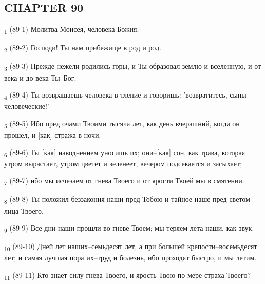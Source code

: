 \subsection{CHAPTER 90}
\begin{tcolorbox}
\textsubscript{1} (89-1) Молитва Моисея, человека Божия.
\end{tcolorbox}
\begin{tcolorbox}
\textsubscript{2} (89-2) Господи! Ты нам прибежище в род и род.
\end{tcolorbox}
\begin{tcolorbox}
\textsubscript{3} (89-3) Прежде нежели родились горы, и Ты образовал землю и вселенную, и от века и до века Ты--Бог.
\end{tcolorbox}
\begin{tcolorbox}
\textsubscript{4} (89-4) Ты возвращаешь человека в тление и говоришь: 'возвратитесь, сыны человеческие!'
\end{tcolorbox}
\begin{tcolorbox}
\textsubscript{5} (89-5) Ибо пред очами Твоими тысяча лет, как день вчерашний, когда он прошел, и [как] стража в ночи.
\end{tcolorbox}
\begin{tcolorbox}
\textsubscript{6} (89-6) Ты [как] наводнением уносишь их; они--[как] сон, как трава, которая утром вырастает, утром цветет и зеленеет, вечером подсекается и засыхает;
\end{tcolorbox}
\begin{tcolorbox}
\textsubscript{7} (89-7) ибо мы исчезаем от гнева Твоего и от ярости Твоей мы в смятении.
\end{tcolorbox}
\begin{tcolorbox}
\textsubscript{8} (89-8) Ты положил беззакония наши пред Тобою и тайное наше пред светом лица Твоего.
\end{tcolorbox}
\begin{tcolorbox}
\textsubscript{9} (89-9) Все дни наши прошли во гневе Твоем; мы теряем лета наши, как звук.
\end{tcolorbox}
\begin{tcolorbox}
\textsubscript{10} (89-10) Дней лет наших--семьдесят лет, а при большей крепости--восемьдесят лет; и самая лучшая пора их--труд и болезнь, ибо проходят быстро, и мы летим.
\end{tcolorbox}
\begin{tcolorbox}
\textsubscript{11} (89-11) Кто знает силу гнева Твоего, и ярость Твою по мере страха Твоего?
\end{tcolorbox}
